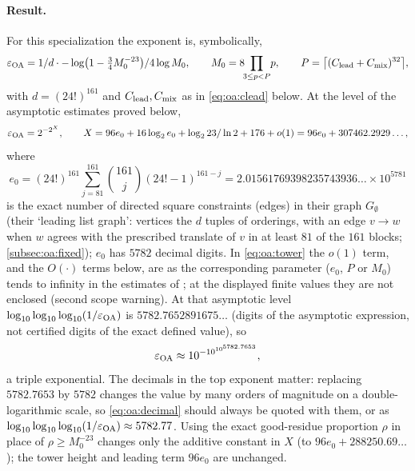 \paragraph{Result.}
For this specialization the exponent is, symbolically,
\begin{equation}\label{eq:oa:symbolic}
  \varepsilon_{\mathrm{OA}}
   =1/d\cdot
     -\log\bigl(1-\tfrac34 M_0^{-23}\bigr)/4\log M_0,
   \qquad
   M_0=8\!\!\prod_{3\le p<P}\!p,\qquad
   P=\big\lceil(C_{\rm lead}+C_{\rm mix})^{32}\big\rceil,
\end{equation}
with $d=(24!)^{161}$ and $C_{\rm lead},C_{\rm mix}$ as in
\eqref{eq:oa:clead} below. At the level of the asymptotic estimates
proved below,
\begin{equation}\label{eq:oa:tower}
  \varepsilon_{\mathrm{OA}}=2^{-2^{X}},\qquad
  X=96e_0+16\log_2e_0+\log_223/\ln2+176+o(1)
   =96e_0+307462.2929\ldots,
\end{equation}
where
\begin{equation}\label{eq:oa:e0}
  e_0=(24!)^{161}\sum_{j=81}^{161}\binom{161}{j}(24!-1)^{161-j}
     =2.01561769398235743936\ldots\times10^{5781}
\end{equation}
is the exact number of directed square constraints (edges) in
their graph $G_\emptyset$ (their `leading list graph': vertices
the $d$ tuples of orderings, with an edge $v\to w$ when $w$ agrees
with the prescribed translate of $v$ in at least $81$ of the $161$
blocks; \cref{subsec:oa:fixed}); $e_0$ has $5782$ decimal
digits. In \eqref{eq:oa:tower} the $o(1)$ term, and the
$O(\cdot)$ terms below, are as the corresponding parameter
($e_0$, $P$ or $M_0$) tends to infinity in the estimates of
\cite{OpenAI}; at the displayed finite values they are not
enclosed (second scope warning). At that asymptotic level
$\log_{10}\log_{10}\log_{10}(1/\varepsilon_{\mathrm{OA}})$ is
$5782.7652891675\ldots$ (digits of the asymptotic expression,
not certified digits of the exact defined value), so
\begin{equation}\label{eq:oa:decimal}
  \varepsilon_{\mathrm{OA}}\approx10^{-10^{10^{5782.7653}}},
\end{equation}
a triple exponential. The decimals in the top exponent matter:
replacing $5782.7653$ by $5782$ changes the value by many orders of
magnitude on a double-logarithmic scale, so \eqref{eq:oa:decimal}
should always be quoted with them, or as
$\log_{10}\log_{10}\log_{10}(1/\varepsilon_{\mathrm{OA}})\approx5782.77$.
Using the exact good-residue proportion $\rho$ in place of
$\rho\ge M_0^{-23}$ changes only the additive constant in $X$ (to
$96e_0+288250.69\ldots$); the tower height and leading term $96e_0$
are unchanged.

